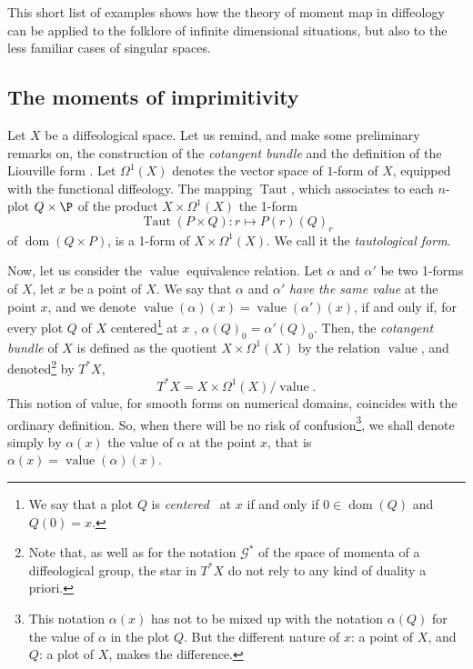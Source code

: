 \documentclass[10pt,reqno,twoside]{amsart}
\newcommand{\cG}{\mathcal{G}}
\DeclareMathOperator{\dom}{dom}
\DeclareMathOperator{\Taut}{Taut}
\DeclareMathOperator{\Value}{value}
\newcommand{\T}{T}
\theoremstyle{plain}
\theoremstyle{definition}
\newcommand{\article}[1]{\subsection{#1}}
\begin{document}
  This short list of examples shows how the theory of moment map in diffeology can be applied to the folklore of infinite dimensional situations,
  but also to the less familiar cases of singular spaces.
  
  \article{The moments of imprimitivity}
  \label{The-moments-of-imprimitivity}
  Let $X$ be a diffeological space.
  Let us remind,
  and make some preliminary remarks on,
  the construction of the {\em cotangent bundle} and the definition of the Liouville form \cite{Piz05}.
  Let $\Omega^1(X)$ denotes the vector space of $1$-form of $X$,
  equipped with the functional diffeology.
  The mapping $\Taut$,
  which associates to each $n$-plot $Q \times \P$ of the product $X \times \Omega^1(X)$ the 1-form
  $$
    \Taut(P \times Q) : r \mapsto P (r)(Q)_r
    $$
  of $\dom(Q \times P)$,
  is a 1-form of $X \times \Omega^1(X)$.
  We call it the {\em tautological form}.
  
  Now,
  let us consider the $\Value$ equivalence relation.
  Let $\alpha$ and $\alpha'$ be two 1-forms of $X$,
  let $x$ be a point of $X$.
  We say that $\alpha$ and $\alpha'$ {\em have the same value} at the point $x$,
  and we denote $\Value(\alpha)(x) = \Value(\alpha')(x)$,
  if and only if,
  for every plot $Q$ of $X$ centered\footnote{We say that a plot $Q$ is {\em centered\ } at $x$ if and only if $0 \in \dom(Q)$ and $Q(0) = x$.} at $x$ ,
  $\alpha(Q)_0 = \alpha'(Q)_0$.
  Then,
  the {\em cotangent bundle} of $X$ is defined as the quotient $X \times \Omega^1(X)$ by the relation $\Value$,
  and denoted\footnote{Note that, as well as for the notation $\cG^*$ of the space of momenta of a diffeological group, the star in $\T^*X$ do not rely to any kind of duality a priori.} by $\T^*X$,
  $$
    \T^*X = X \times \Omega^1(X) / \Value.
    $$
  This notion of value,
  for smooth forms on numerical domains,
  coincides with the ordinary definition.
  So,
  when there will be no risk of confusion\footnote{This notation $\alpha(x)$ has not to be mixed up with the notation $\alpha(Q)$ for the value of $\alpha$ in the plot $Q$. But the different nature of $x$: a point of $X$, and $Q$: a plot of $X$, makes the difference.},
  we shall denote simply by $\alpha(x)$ the value of $\alpha$ at the point $x$,
  that is $\alpha(x) = \Value(\alpha)(x)$.
  
\end{document}
